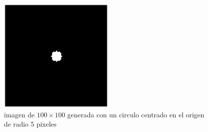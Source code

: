 \documentclass[11pt, twocolumn]{article}
\begin{document}
\begin{figure} [htbp]
    \centering
    \includegraphics*[width=0.5\textwidth]{./images/ej_6/circle.png}
    \caption{imagen de $100\times100$ generada con un circulo centrado en el origen de radio 5 pixeles}
    \label{fig:circle_ej_6}
\end{figure}
\end{document}
